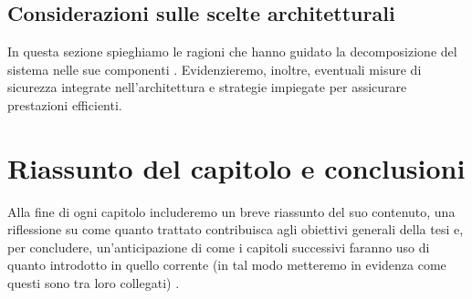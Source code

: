 \subsection{Considerazioni sulle scelte architetturali}

In questa sezione spieghiamo le ragioni che hanno guidato la decomposizione del sistema nelle sue componenti \cite{harran2023design}. Evidenzieremo, inoltre, eventuali misure di sicurezza integrate nell'architettura e strategie impiegate per assicurare prestazioni efficienti.

\section{Riassunto del capitolo e conclusioni}

Alla fine di ogni capitolo includeremo un breve riassunto del suo contenuto, una riflessione su come quanto trattato contribuisca agli obiettivi generali della tesi e, per concludere, un'anticipazione di come i capitoli successivi faranno uso di quanto introdotto in quello corrente (in tal modo metteremo in evidenza come questi sono tra loro collegati) \cite{zobel2015writing}.
